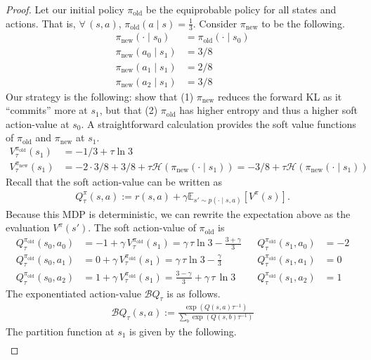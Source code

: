 \documentclass[twoside,11pt]{article}
\newcommand{\Ex}{\mathbb{E}}
\newcommand{\boltzmannQ}{\mathcal{B}Q}
\newcommand{\entropy}{\mathcal{H}}
\newcommand{\pinew}{{\pi_\mathrm{new}}}
\newcommand{\piold}{{\pi_\mathrm{old}}}
\begin{document}
\begin{proof}
Let our initial policy $\piold$ be the equiprobable policy for all states and actions. That is, $\forall\, (s, a)$, $\piold(a \mid s) = \frac{1}{3}$. Consider $\pinew$ to be the following. 
\begin{align*}
    \pinew(\cdot \mid s_0) &= \piold(\cdot \mid s_0)\\
    \pinew(a_0 \mid s_1) &= 3/8 \\
    \pinew(a_1 \mid s_1) &= 2/8\\
    \pinew(a_2 \mid s_1) &= 3/8
\end{align*}
%
Our strategy is the following: show that (1) $\pinew$ reduces the forward KL as it ``commits'' more at $s_1$, but that (2) $\piold$ has higher entropy and thus a higher soft action-value at $s_0$. A straightforward calculation provides the soft value functions of $\piold$ and $\pinew$ at $s_1$.
\begin{align*}
    V_\tau^\piold(s_1) &= -1/3  + \tau \ln 3    \\
    V_\tau^\pinew(s_1) &= -2 \cdot 3/8 + 3/8 + \tau \entropy(\pinew(\cdot \mid s_1)) = -3/8 + \tau\entropy(\pinew(\cdot \mid s_1))
\end{align*}
Recall that the soft action-value can be written as 
\begin{align*}
    Q_\tau^\pi(s, a) := r(s, a) + \gamma \Ex_{s'\sim p(\cdot \mid s, a)}[V^\pi(s)]. 
\end{align*}
Because this MDP is deterministic, we can rewrite the expectation above as the evaluation $V^\pi(s')$. The soft action-value of $\piold$ is 
\begin{align*}
    Q_\tau^\piold(s_0, a_0) &= -1 + \gamma \, V_\tau^\piold(s_1) = \gamma \,\tau \ln 3 - \frac{3 + \gamma}{3}  && Q_\tau^\piold(s_1, a_0) &= -2 \\
    Q_\tau^\piold(s_0, a_1) &= 0 +  \gamma\, V_\tau^\piold(s_1) = \gamma \,\tau\ln3 - \frac{\gamma}{3} && Q_\tau^\piold(s_1, a_1) &= 0 \\
    Q_\tau^\piold(s_0, a_2) &= 1 + \gamma\, V_\tau^\piold(s_1) = \frac{3 - \gamma}{3} + \gamma \,\tau\, \ln3 && Q_\tau^\piold(s_1, a_2) &= 1  
\end{align*}
%
The exponentiated action-value $\boltzmannQ_\tau$ is as follows.
\begin{align*}
    \boltzmannQ_\tau(s, a) := \frac{\exp(Q(s, a) \tau^{-1})}{\sum\limits_b \exp(Q(s, b) \tau^{-1})}
\end{align*}
%
The partition function at $s_1$ is given by the following.
\begin{align*}

\end{align*}
\end{proof}
\end{document}
